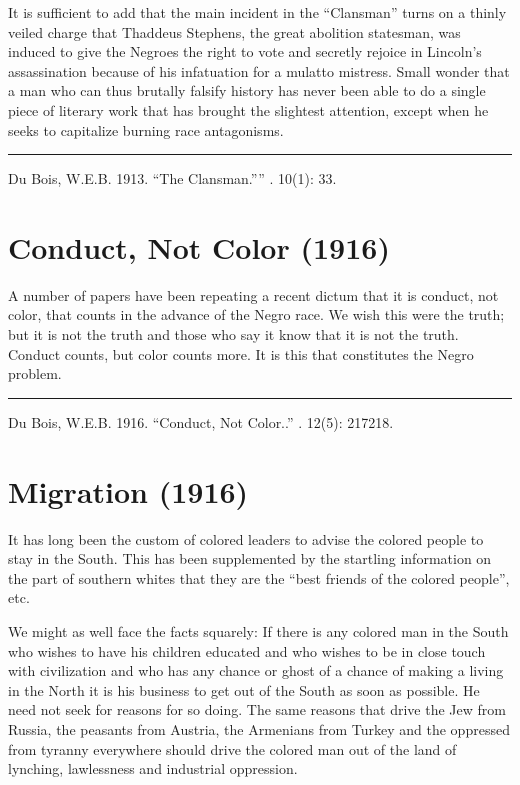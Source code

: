 \documentclass[letterpaper,10pt,english]{jupyterBook}
\begin{document}
\sphinxAtStartPar
It is sufficient to add that the main incident in the “Clansman” turns on a thinly veiled charge that Thaddeus Stephens, the great abolition statesman, was induced to give the Negroes the right to vote and secretly rejoice in Lincoln’s assassination because of his infatuation for a mulatto mistress. Small wonder that a man who can thus brutally falsify history has never been able to do a single piece of literary work that has brought the slightest attention, except when he seeks to capitalize burning race antagonisms.


\bigskip\hrule\bigskip


\sphinxAtStartPar
{} Du Bois, W.E.B. 1913. “The Clansman.”” . 10(1): 33.


\section{Conduct, Not Color (1916)}
\label{\detokenize{Volumes/12/05/conduct_not_color:conduct-not-color-1916}}\label{\detokenize{Volumes/12/05/conduct_not_color::doc}}
\sphinxAtStartPar
A number of papers have been repeating a recent dictum that it is conduct, not color, that counts in the advance  of the Negro race. We wish this were the truth; but it is not the truth and those who say it know that it is not the truth. Conduct counts, but color counts more. It is this that constitutes the Negro problem.


\bigskip\hrule\bigskip


\sphinxAtStartPar
{} Du Bois, W.E.B. 1916. “Conduct, Not Color..” . 12(5): 217\sphinxhyphen{}218.


\section{Migration (1916)}
\label{\detokenize{Volumes/12/06/migration:migration-1916}}\label{\detokenize{Volumes/12/06/migration::doc}}
\sphinxAtStartPar
It has long been the custom of colored leaders to advise the colored people to stay in the South. This has been supplemented by the startling information on the part of southern whites
that they are the “best friends of the colored people”, etc.

\sphinxAtStartPar
We might as well face the facts squarely: If there is any colored man in the South who wishes to have his children educated and who wishes to be in close touch with civilization and who has any chance or ghost of a chance of making a living in the North it is his business to get out of the South as soon as possible. He need not seek for reasons for so doing. The same reasons that drive the Jew from Russia, the peasants from Austria, the Armenians from Turkey and the oppressed from tyranny everywhere should drive the colored man out of the land of lynching, lawlessness and industrial oppression.
\end{document}
